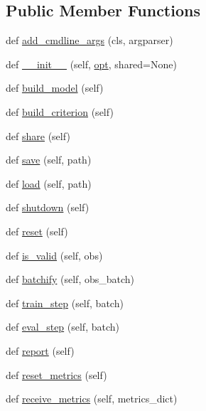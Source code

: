 \subsection*{Public Member Functions}
\begin{DoxyCompactItemize}
\item 
def \hyperlink{classparlai_1_1agents_1_1fairseq_1_1fairseq_1_1FairseqAgent_aeed796aa922405b6a4b191174872d5b2}{add\+\_\+cmdline\+\_\+args} (cls, argparser)
\item 
def \hyperlink{classparlai_1_1agents_1_1fairseq_1_1fairseq_1_1FairseqAgent_ac203ba228e9e3dd20568b986ef600a62}{\+\_\+\+\_\+init\+\_\+\+\_\+} (self, \hyperlink{classparlai_1_1agents_1_1fairseq_1_1fairseq_1_1FairseqAgent_a0029f91bc5f186deb354f2309c837dc0}{opt}, shared=None)
\item 
def \hyperlink{classparlai_1_1agents_1_1fairseq_1_1fairseq_1_1FairseqAgent_a275a60cb93929725725d103fc76905ba}{build\+\_\+model} (self)
\item 
def \hyperlink{classparlai_1_1agents_1_1fairseq_1_1fairseq_1_1FairseqAgent_a1ec171aaa11cc89157238d60da9661a0}{build\+\_\+criterion} (self)
\item 
def \hyperlink{classparlai_1_1agents_1_1fairseq_1_1fairseq_1_1FairseqAgent_abf0abba72dd186a1a3773a04f7cde12d}{share} (self)
\item 
def \hyperlink{classparlai_1_1agents_1_1fairseq_1_1fairseq_1_1FairseqAgent_ad4804131388a6f88f01fc124e7692069}{save} (self, path)
\item 
def \hyperlink{classparlai_1_1agents_1_1fairseq_1_1fairseq_1_1FairseqAgent_a20245b04f2a8229809368fb7c43f81e3}{load} (self, path)
\item 
def \hyperlink{classparlai_1_1agents_1_1fairseq_1_1fairseq_1_1FairseqAgent_a76856ecae016691ada6f7187d6aa744a}{shutdown} (self)
\item 
def \hyperlink{classparlai_1_1agents_1_1fairseq_1_1fairseq_1_1FairseqAgent_acc5aa3887a6bf3ece28d60a9572fe50e}{reset} (self)
\item 
def \hyperlink{classparlai_1_1agents_1_1fairseq_1_1fairseq_1_1FairseqAgent_a42b30bed79467abe02d8b7c65ff33b9c}{is\+\_\+valid} (self, obs)
\item 
def \hyperlink{classparlai_1_1agents_1_1fairseq_1_1fairseq_1_1FairseqAgent_ae5dc403e172c9cb8ecd48525175af56d}{batchify} (self, obs\+\_\+batch)
\item 
def \hyperlink{classparlai_1_1agents_1_1fairseq_1_1fairseq_1_1FairseqAgent_a57902d8fdb473ce9d791df532db41eee}{train\+\_\+step} (self, batch)
\item 
def \hyperlink{classparlai_1_1agents_1_1fairseq_1_1fairseq_1_1FairseqAgent_aa635ffc4c0a0649c66b9b1cbb4dd5367}{eval\+\_\+step} (self, batch)
\item 
def \hyperlink{classparlai_1_1agents_1_1fairseq_1_1fairseq_1_1FairseqAgent_af7629e9695ec1f9e0f7368095a41b69c}{report} (self)
\item 
def \hyperlink{classparlai_1_1agents_1_1fairseq_1_1fairseq_1_1FairseqAgent_a029d7193a532d4cf75433e82817ab414}{reset\+\_\+metrics} (self)
\item 
def \hyperlink{classparlai_1_1agents_1_1fairseq_1_1fairseq_1_1FairseqAgent_a29521783f42e437063f9d861133965b0}{receive\+\_\+metrics} (self, metrics\+\_\+dict)
\end{DoxyCompactItemize}
